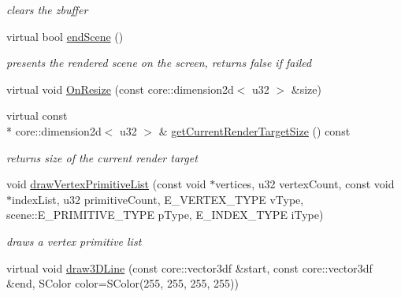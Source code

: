 \begin{DoxyCompactItemize}
\begin{DoxyCompactList}\small\item\em clears the zbuffer \end{DoxyCompactList}\item 
\hypertarget{classirr_1_1video_1_1_c_software_driver_ad19688733aa008c91c30ab08d10f6d26}{virtual bool \hyperlink{classirr_1_1video_1_1_c_software_driver_ad19688733aa008c91c30ab08d10f6d26}{end\-Scene} ()}\label{classirr_1_1video_1_1_c_software_driver_ad19688733aa008c91c30ab08d10f6d26}

\begin{DoxyCompactList}\small\item\em presents the rendered scene on the screen, returns false if failed \end{DoxyCompactList}\item 
virtual void \hyperlink{classirr_1_1video_1_1_c_software_driver_aede9981a1ee57e15c90f5310c907ec86}{On\-Resize} (const core\-::dimension2d$<$ u32 $>$ \&size)
\item 
\hypertarget{classirr_1_1video_1_1_c_software_driver_a7f6b977bc2fc758052abcd06b2681634}{virtual const \\*
core\-::dimension2d$<$ u32 $>$ \& \hyperlink{classirr_1_1video_1_1_c_software_driver_a7f6b977bc2fc758052abcd06b2681634}{get\-Current\-Render\-Target\-Size} () const }\label{classirr_1_1video_1_1_c_software_driver_a7f6b977bc2fc758052abcd06b2681634}

\begin{DoxyCompactList}\small\item\em returns size of the current render target \end{DoxyCompactList}\item 
\hypertarget{classirr_1_1video_1_1_c_software_driver_a5a9bd4fc2a1c1a15c53b27722b82367d}{void \hyperlink{classirr_1_1video_1_1_c_software_driver_a5a9bd4fc2a1c1a15c53b27722b82367d}{draw\-Vertex\-Primitive\-List} (const void $\ast$vertices, u32 vertex\-Count, const void $\ast$index\-List, u32 primitive\-Count, E\-\_\-\-V\-E\-R\-T\-E\-X\-\_\-\-T\-Y\-P\-E v\-Type, scene\-::\-E\-\_\-\-P\-R\-I\-M\-I\-T\-I\-V\-E\-\_\-\-T\-Y\-P\-E p\-Type, E\-\_\-\-I\-N\-D\-E\-X\-\_\-\-T\-Y\-P\-E i\-Type)}\label{classirr_1_1video_1_1_c_software_driver_a5a9bd4fc2a1c1a15c53b27722b82367d}

\begin{DoxyCompactList}\small\item\em draws a vertex primitive list \end{DoxyCompactList}\item 
\hypertarget{classirr_1_1video_1_1_c_software_driver_af75755c9f5c6c6b71b2811053d51f5f9}{virtual void \hyperlink{classirr_1_1video_1_1_c_software_driver_af75755c9f5c6c6b71b2811053d51f5f9}{draw3\-D\-Line} (const core\-::vector3df \&start, const core\-::vector3df \&end, S\-Color color=S\-Color(255, 255, 255, 255))}\label{classirr_1_1video_1_1_c_software_driver_af75755c9f5c6c6b71b2811053d51f5f9}


\end{DoxyCompactItemize}
